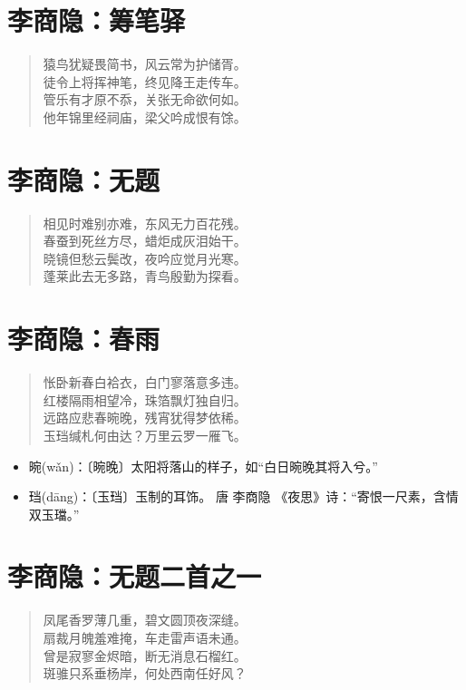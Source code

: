 \documentclass[12pt,oneside]{book}
\newenvironment{shici}{%
\begin{verse}\centering\yanti\large\hspace{12pt}}{\end{verse}}
\begin{document}
\begin{common-format}
\chapter{李商隐：筹笔驿}
\begin{shici}
猿鸟犹疑畏简书，风云常为护储胥。\\
徒令上将挥神笔，终见降王走传车。\\
管乐有才原不忝，关张无命欲何如。\\
他年锦里经祠庙，梁父吟成恨有馀。
\end{shici}

\chapter{李商隐：无题}
\begin{shici}
相见时难别亦难，东风无力百花残。\\
春蚕到死丝方尽，蜡炬成灰泪始干。\\
晓镜但愁云鬓改，夜吟应觉月光寒。\\
蓬莱此去无多路，青鸟殷勤为探看。
\end{shici}

\chapter{李商隐：春雨}
\begin{shici}
怅卧新春白袷衣，白门寥落意多违。\\
红楼隔雨相望冷，珠箔飘灯独自归。\\
远路应悲春晼晚，残宵犹得梦依稀。\\
玉珰缄札何由达？万里云罗一雁飞。
\end{shici}

\begin{itemize}
\item 晼(wǎn)：〔晼晚〕太阳将落山的样子，如“白日晼晚其将入兮。”
\item 珰(dāng)：〔玉珰〕玉制的耳饰。 唐 李商隐 《夜思》诗：“寄恨一尺素，含情双玉璫。”
\end{itemize}

\chapter{李商隐：无题二首之一}
\begin{shici}
凤尾香罗薄几重，碧文圆顶夜深缝。\\
扇裁月魄羞难掩，车走雷声语未通。\\
曾是寂寥金烬暗，断无消息石榴红。\\
斑骓只系垂杨岸，何处西南任好风？
\end{shici}


\end{common-format}
\end{document}
